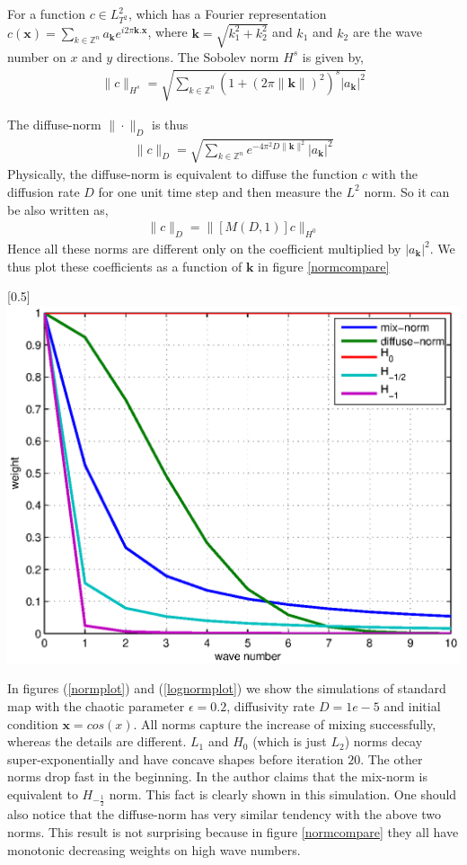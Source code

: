 \documentclass{article}
\begin{document}
For a function $c \in L^{2}_{T^2}$, which has a Fourier
representation $c(\mathbf{x}) = \sum_{k \in \mathbb{Z}^n}
a_\mathbf{k} e^{i 2 \pi \mathbf{k.x}}$, where $\mathbf{k}=
\sqrt{k_1^2+k_2^2}$ and $k_1$ and $k_2$ are the wave number on $x$
and $y$ directions. The Sobolev norm $H^s$ is given by,
\begin{eqnarray}
  \|c\|_{H^s} = \sqrt{\sum_{k \in \mathbb{Z}^n}   \left(1+(2 \pi \|\mathbf{k}\|)^2\right)^s |a_{\mathbf{k}} |^2   }
\end{eqnarray}

The diffuse-norm $\|\cdot\|_D$ is thus
\begin{eqnarray}
  \|c\|_D = \sqrt{\sum_{k \in \mathbb{Z}^n} e^{-4 \pi^2 D \|\mathbf{k}\|^2} |a_{\mathbf{k}} |^2   }
\end{eqnarray}
Physically, the diffuse-norm is equivalent to diffuse the function
$c$ with the diffusion rate $D$ for one unit time step and then
measure the $L^2$ norm. So it can be also written as,
\begin{eqnarray}
  \|c\|_D = \|[M(D,1)] c \|_{H^0}
\end{eqnarray}
Hence all these norms are different only on the coefficient
multiplied by $|a_{\mathbf{k}} |^2$. We thus plot these coefficients
as a function of $\mathbf{k}$ in figure \ref{normcompare}

\centerline{\scalebox{0.5}[0.5]{\includegraphics{normcompare.eps} \label{normcompare}}}

In figures (\ref{normplot}) and (\ref{lognormplot}) we show the
simulations of standard map with the chaotic parameter $\epsilon =
0.2$, diffusivity rate $D = 1e-5$ and initial condition $\mathbf{x}
= cos(x)$. All norms capture the increase of mixing successfully,
whereas the details are different. $L_1$ and $H_0$ (which is just
$L_2$) norms decay super-exponentially and have concave shapes
before iteration $20$. The other norms drop fast in the beginning.
In \cite{Mezic2005} the author claims that the mix-norm is
equivalent to $H_{-\frac{1}{2}}$ norm. This fact is clearly shown in
this simulation. One should also notice that the diffuse-norm has
very similar tendency with the above two norms. This result is not
surprising because in figure \ref{normcompare} they all have
monotonic decreasing weights on high wave numbers.
\end{document}
